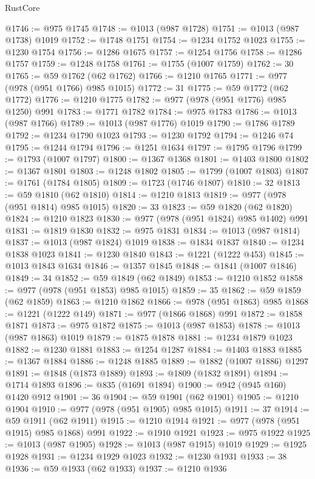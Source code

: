 \begin{lexlean}{RustCore}
\begin{coremodule}
@1746 := @975 @1745
@1748 := @1013 (@987 @1728)
@1751 := @1013 (@987 @1738) @1019
@1752 := @1748 @1751
@1754 := @1234 @1752 @1023
@1755 := @1230 @1754
@1756 := @1286 @1675
@1757 := @1254 @1756
@1758 := @1286 @1757
@1759 := @1248 @1758
@1761 := @1755 (@1007 @1759)
@1762 := 30
@1765 := @59 @1762 (@62 @1762)
@1766 := @1210 @1765
@1771 := @977 (@978 (@951 @1766) @985 @1015)
@1772 := 31
@1775 := @59 @1772 (@62 @1772)
@1776 := @1210 @1775
@1782 := @977 (@978 (@951 @1776) @985 @1250) @991
@1783 := @1771 @1782
@1784 := @975 @1783
@1786 := @1013 (@987 @1766)
@1789 := @1013 (@987 @1776) @1019
@1790 := @1786 @1789
@1792 := @1234 @1790 @1023
@1793 := @1230 @1792
@1794 := @1246 @74
@1795 := @1244 @1794
@1796 := @1251 @1634
@1797 := @1795 @1796
@1799 := @1793 (@1007 @1797)
@1800 := @1367 @1368
@1801 := @1403 @1800
@1802 := @1367 @1801
@1803 := @1248 @1802
@1805 := @1799 (@1007 @1803)
@1807 := @1761 (@1784 @1805)
@1809 := @1723 (@1746 @1807)
@1810 := 32
@1813 := @59 @1810 (@62 @1810)
@1814 := @1210 @1813
@1819 := @977 (@978 (@951 @1814) @985 @1015)
@1820 := 33
@1823 := @59 @1820 (@62 @1820)
@1824 := @1210 @1823
@1830 := @977 (@978 (@951 @1824) @985 @1402) @991
@1831 := @1819 @1830
@1832 := @975 @1831
@1834 := @1013 (@987 @1814)
@1837 := @1013 (@987 @1824) @1019
@1838 := @1834 @1837
@1840 := @1234 @1838 @1023
@1841 := @1230 @1840
@1843 := @1221 (@1222 @453)
@1845 := @1013 @1843 @1634
@1846 := @1357 @1845
@1848 := @1841 (@1007 @1846)
@1849 := 34
@1852 := @59 @1849 (@62 @1849)
@1853 := @1210 @1852
@1858 := @977 (@978 (@951 @1853) @985 @1015)
@1859 := 35
@1862 := @59 @1859 (@62 @1859)
@1863 := @1210 @1862
@1866 := @978 (@951 @1863) @985
@1868 := @1221 (@1222 @149)
@1871 := @977 (@1866 @1868) @991
@1872 := @1858 @1871
@1873 := @975 @1872
@1875 := @1013 (@987 @1853)
@1878 := @1013 (@987 @1863) @1019
@1879 := @1875 @1878
@1881 := @1234 @1879 @1023
@1882 := @1230 @1881
@1883 := @1254 @1287
@1884 := @1403 @1883
@1885 := @1367 @1884
@1886 := @1248 @1885
@1889 := @1882 (@1007 @1886) @1297
@1891 := @1848 (@1873 @1889)
@1893 := @1809 (@1832 @1891)
@1894 := @1714 @1893
@1896 := @835 (@1691 @1894)
@1900 := @942 (@945 @160) @1420 @912
@1901 := 36
@1904 := @59 @1901 (@62 @1901)
@1905 := @1210 @1904
@1910 := @977 (@978 (@951 @1905) @985 @1015)
@1911 := 37
@1914 := @59 @1911 (@62 @1911)
@1915 := @1210 @1914
@1921 := @977 (@978 (@951 @1915) @985 @1868) @991
@1922 := @1910 @1921
@1923 := @975 @1922
@1925 := @1013 (@987 @1905)
@1928 := @1013 (@987 @1915) @1019
@1929 := @1925 @1928
@1931 := @1234 @1929 @1023
@1932 := @1230 @1931
@1933 := 38
@1936 := @59 @1933 (@62 @1933)
@1937 := @1210 @1936

\end{coremodule}
\end{lexlean}
